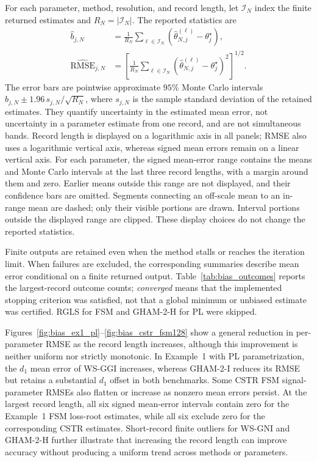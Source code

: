 For each parameter, method, resolution, and record length, let
$\mathcal I_N$ index the finite returned estimates and
$R_N=|\mathcal I_N|$. The reported statistics are
\begin{align}
\label{eq:bias_mc_statistics}
 \widehat b_{j,N}
 &=\frac{1}{R_N}\sum_{\ell\in\mathcal I_N}
       \left(\widehat\theta_{N,j}^{(\ell)}-\theta_j^\star\right),\\
 \widehat{\mathrm{RMSE}}_{j,N}
 &=\left[
   \frac{1}{R_N}\sum_{\ell\in\mathcal I_N}
       \left(\widehat\theta_{N,j}^{(\ell)}-\theta_j^\star\right)^2
   \right]^{1/2}.\nonumber
\end{align}
The error bars are pointwise approximate $95\%$ Monte Carlo intervals
$\widehat b_{j,N}\pm1.96\,s_{j,N}/\sqrt{R_N}$, where $s_{j,N}$ is the
sample standard deviation of the retained estimates. They quantify
uncertainty in the estimated mean error, not uncertainty in a parameter
estimate from one record, and are not simultaneous bands.
Record length is displayed on a logarithmic axis in all panels; RMSE
also uses a logarithmic vertical axis, whereas signed mean errors
remain on a linear vertical axis.
For each parameter, the signed mean-error range contains the means and
Monte Carlo intervals at the last three record lengths, with a margin
around them and zero. Earlier means outside this range are not displayed,
and their confidence bars are omitted. Segments connecting an off-scale
mean to an in-range mean are dashed; only their visible portions are
drawn. Interval portions outside the displayed range are clipped.
These display choices do not change the reported statistics.

Finite outputs are retained even when the method stalls or reaches the
iteration limit. When failures are excluded, the corresponding summaries
describe mean error conditional on a finite returned output.
Table~\ref{tab:bias_outcomes} reports the largest-record outcome counts;
\emph{converged} means that the implemented stopping criterion was
satisfied, not that a global minimum or unbiased estimate was certified.
RGLS for FSM and GHAM-2-H for PL were skipped.

Figures~\ref{fig:bias_ex1_pl}--\ref{fig:bias_cstr_fsm128} show a general
reduction in per-parameter RMSE as the record length increases, although
this improvement is neither uniform nor strictly monotonic. In
Example~1 with PL parametrization, the $d_1$ mean error of WS-GGI
increases, whereas GHAM-2-I reduces its RMSE but retains a substantial
$d_1$ offset in both benchmarks. Some CSTR FSM signal-parameter RMSEs
also flatten or increase as nonzero mean errors persist. At the largest
record length, all six signed mean-error intervals contain zero for
the Example~1 FSM loss-root estimates, while all six exclude zero for
the corresponding CSTR estimates. Short-record finite outliers for
WS-GNI and GHAM-2-H further illustrate that increasing the record length
can improve accuracy without producing a uniform trend across methods
or parameters.

